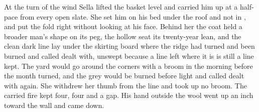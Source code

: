 At the turn of the wind Sella lifted the basket level and carried him up  at a half-pace from every open slate. She set him on his bed under the roof and not in , and put the fold right without looking at his face. Behind her the coat held a broader man's shape on its peg, the hollow seat its twenty-year lean, and the clean dark line lay under the skirting board where the ridge had turned and been burned and called dealt with, unswept because a line left where it is is still a line kept. The yard would go around the corners with a broom in the morning before the month turned, and the grey would be burned before light and called dealt with again. She withdrew her thumb from the line and took up no broom. The carried fire kept four, four and a gap. His hand outside the wool went up an inch toward the wall and came down.
